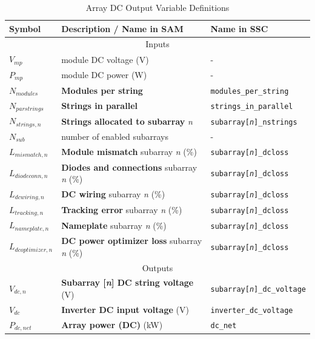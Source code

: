 \documentclass[12pt,letterpaper]{article}
\begin{document}
\begin{table}
\begin{center}
\caption{Array DC Output Variable Definitions}
\begin{tabular}{lll}
\midrule
Symbol & Description / \textbf{Name in SAM} & Name in SSC \\
\midrule
\multicolumn{3}{c}{Inputs}\\
$V_{mp}$ & module DC voltage (V)& - \\
$P_{mp}$ & module DC power (W) & - \\
$N_{modules}$ & \textbf{Modules per string} & \texttt{modules\_per\_string} \\
$N_{parstrings}$ & \textbf{Strings in parallel} & \texttt{strings\_in\_parallel} \\
$N_{strings,n}$ & \textbf{Strings allocated to subarray} \textit{n} & \texttt{subarray[\textit{n}]\_nstrings} \\
$N_{sub}$ & number of enabled subarrays & - \\
$L_{mismatch,n}$ & \textbf{Module mismatch} subarray \textit{n} (\%)&  \texttt{subarray[\textit{n}]\_dcloss} \\
$L_{diodeconn,n}$ & \textbf{Diodes and connections} subarray \textit{n} (\%)&  \texttt{subarray[\textit{n}]\_dcloss} \\
$L_{dcwiring,n}$ & \textbf{DC wiring} subarray \textit{n} (\%)&  \texttt{subarray[\textit{n}]\_dcloss} \\
$L_{tracking,n}$ & \textbf{Tracking error} subarray \textit{n} (\%)&  \texttt{subarray[\textit{n}]\_dcloss} \\
$L_{nameplate,n}$ & \textbf{Nameplate} subarray \textit{n} (\%)&  \texttt{subarray[\textit{n}]\_dcloss} \\
$L_{dcoptimizer,n}$ & \textbf{DC power optimizer loss} subarray \textit{n} (\%)&  \texttt{subarray[\textit{n}]\_dcloss} \\
\midrule
\multicolumn{3}{c}{Outputs}\\
$V_{dc,n}$ & \textbf{Subarray [\textit{n}] DC string voltage} (V)& \texttt{subarray[\textit{n}]\_dc\_voltage} \\
$V_{dc}$ & \textbf{Inverter DC input voltage} (V)& \texttt{inverter\_dc\_voltage} \\
$P_{dc,net}$ & \textbf{Array power (DC)} (kW)& \texttt{dc\_net} \\
\hline
\end{tabular}
\label{tab-arraydcoutputvars}
\end{center}
\end{table}
\end{document}
